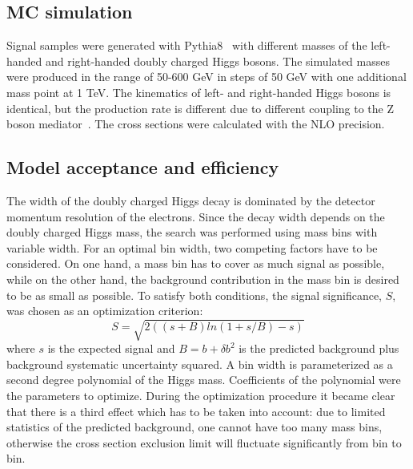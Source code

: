 \subsection{MC simulation}
Signal samples were generated with Pythia8~\cite{pythia8} with different masses of the left-handed and right-handed doubly charged Higgs bosons.
The simulated masses were produced in the range of 50-600 GeV in steps of 50 GeV with one additional mass point at 1 TeV.
The kinematics of left- and right-handed Higgs bosons is identical, but the production rate is different due to different coupling to the Z boson mediator~\cite{dch_note}. The cross sections were calculated with the NLO precision. 

\subsection{Model acceptance and efficiency}
The width of the doubly charged Higgs decay is dominated by the detector momentum resolution of the electrons. Since the decay width depends on the doubly charged Higgs mass, the search was performed using mass bins with variable width.
For an optimal bin width, two competing factors have to be considered.
On one hand, a mass bin has to cover as much signal as possible,
while on the other hand, the background contribution in the mass bin is desired to be as small as possible.
To satisfy both conditions, the signal significance, $S$, was chosen as an optimization criterion:
\begin{equation}
 S = \sqrt{ 2((s+B)ln(1+s/B)-s) } 
\end{equation}
where $s$ is the expected signal and $B=b+\delta b^2$ is the predicted background plus background systematic uncertainty squared.
A bin width is parameterized as a second degree polynomial of the Higgs mass.
Coefficients of the polynomial were the parameters to optimize.
During the optimization procedure it became clear that there is a third effect which has to be taken into account:
due to limited statistics of the predicted background, one cannot have too many mass bins, otherwise the cross section
exclusion limit will fluctuate significantly from bin to bin. 

